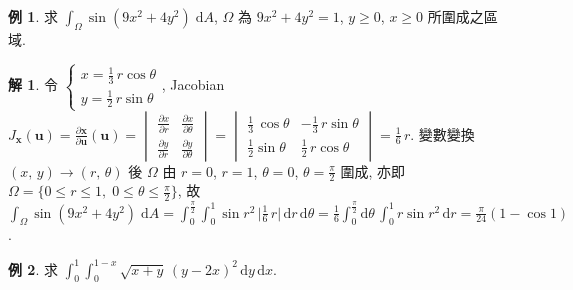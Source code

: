 \documentclass[12pt]{extarticle}
\newcommand{\ds}{\displaystyle}
\theoremstyle{definition}
\newtheorem*{ex}{例}
\newtheorem*{sol}{解}
\newcommand{\vu}{\mathbf{u}}
\newcommand{\vx}{\mathbf{x}}
\begin{document}
\begin{ex}
  求 $\ds\int_\Omega\sin(9x^2 + 4y^2)\;\text{d}A$, $\Omega$ 為 $9x^2 + 4y^2 = 1$, $y\geqslant 0$, $x\geqslant 0$ 所圍成之區域. 
\end{ex}

\begin{sol}
  令 $\ds\begin{cases}x = \frac{1}{3}\,r\cos\theta \\ y = \frac{1}{2}\,r\sin\theta \end{cases}\!\!\!\!\!$, Jacobian $\ds J_{\vx}(\vu) = \frac{\partial\vx}{\partial\vu}(\vu) = \begin{vmatrix}\frac{\partial x}{\partial r} & \frac{\partial x}{\partial\theta} \\ \frac{\partial y}{\partial r}& \frac{\partial y}{\partial\theta}\end{vmatrix} = \begin{vmatrix} \frac{1}{3}\,\cos\theta & -\frac{1}{3}\,r\sin\theta\\ \frac{1}{2}\sin\theta & \frac{1}{2}\,r\cos\theta\end{vmatrix} = \frac{1}{6}\,r$. 變數變換 $(x,\,y)\to(r,\,\theta)$ 後 $\Omega$ 由 $r = 0$, $r = 1$, $\theta = 0$, $\ds\theta = \frac{\pi}{2}$ 圍成, 亦即 $\ds\Omega = \{0\leqslant r\leqslant 1,\;0\leqslant\theta\leqslant\frac{\pi}{2}\}$, 故 $\ds\int_\Omega\!\sin(9x^2 + 4y^2)\;\text{d}A = \int_0^{\frac{\pi}{2}}\!\int_0^1\!\sin r^2\,\big|\frac{1}{6}\,r\big|\,\text{d}r\,\text{d}\theta = \frac{1}{6}\int_0^{\frac{\pi}{2}}\!\text{d}\theta\,\int_0^1\!\!r\sin r^2\,\text{d}r = \frac{\pi}{24}(1 - \cos 1)$.
\end{sol}

\begin{ex}
  求 $\ds\int_0^1\!\int_0^{1 - x}\!\sqrt{x + y}\,(y - 2x)^2\,\text{d}y\,\text{d}x$.
\end{ex}
\end{document}
